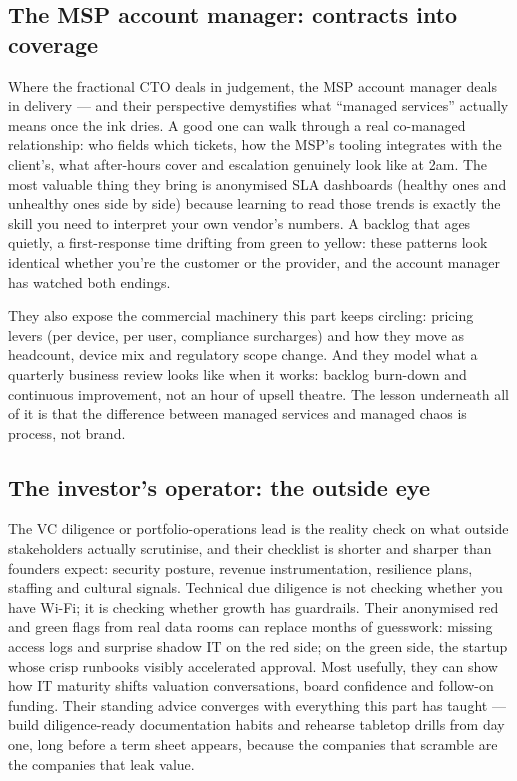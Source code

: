 \subsection{The MSP account manager: contracts into coverage}


Where the fractional CTO deals in judgement, the MSP account manager deals in delivery — and their perspective demystifies what ``managed services'' actually means once the ink dries. A good one can walk through a real co-managed relationship: who fields which tickets, how the MSP's tooling integrates with the client's, what after-hours cover and escalation genuinely look like at 2am. The most valuable thing they bring is anonymised SLA dashboards (healthy ones and unhealthy ones side by side) because learning to read those trends is exactly the skill you need to interpret your own vendor's numbers. A backlog that ages quietly, a first-response time drifting from green to yellow: these patterns look identical whether you're the customer or the provider, and the account manager has watched both endings.


They also expose the commercial machinery this part keeps circling: pricing levers (per device, per user, compliance surcharges) and how they move as headcount, device mix and regulatory scope change. And they model what a quarterly business review looks like when it works: backlog burn-down and continuous improvement, not an hour of upsell theatre. The lesson underneath all of it is that the difference between managed services and managed chaos is process, not brand.



\subsection{The investor's operator: the outside eye}


The VC diligence or portfolio-operations lead is the reality check on what outside stakeholders actually scrutinise, and their checklist is shorter and sharper than founders expect: security posture, revenue instrumentation, resilience plans, staffing and cultural signals. Technical due diligence is not checking whether you have Wi-Fi; it is checking whether growth has guardrails. Their anonymised red and green flags from real data rooms can replace months of guesswork: missing access logs and surprise shadow IT on the red side; on the green side, the startup whose crisp runbooks visibly accelerated approval. Most usefully, they can show how IT maturity shifts valuation conversations, board confidence and follow-on funding. Their standing advice converges with everything this part has taught — build diligence-ready documentation habits and rehearse tabletop drills from day one, long before a term sheet appears, because the companies that scramble are the companies that leak value.



